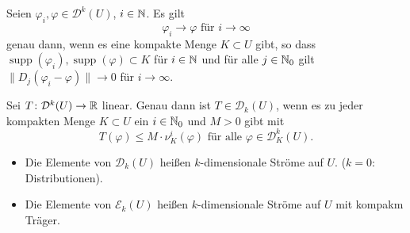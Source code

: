 \documentclass[a4paper,twoside,DIV15,BCOR12mm]{scrbook}
\DeclareMathOperator{\supp}{supp}
\begin{document}
\begin{lemma}
\label{lem:4.8}
Seien $\varphi_i, \varphi\in \mathcal D^k(U)$, $i\in \mathbb{N}$. Es gilt
\[
\varphi_i \to \varphi\text{ für }i\to\infty
\]
genau dann, wenn es eine kompakte Menge $K\subset U$ gibt, so dass $\supp(\varphi_i), \supp(\varphi) \subset K$ für $i\in \mathbb{N}$ und für alle $j\in\mathbb{N}_0$ gilt $\| D_j(\varphi_i - \varphi)\| \to 0$ für $i\to\infty$.
\end{lemma}

\begin{lemma}
\label{lem:4.9}
Sei $T\colon \mathcal D^k(U) \to\mathbb{R}$ linear. Genau dann ist $T\in \mathcal D_k(U)$, wenn es zu jeder kompakten Menge $K\subset U$ ein $i\in\mathbb{N}_0$ und $M>0$ gibt mit
\[
T(\varphi) \le M\cdot \nu_K^i(\varphi)  \text{ für alle } \varphi \in \mathcal D_K^k(U).
\]
\end{lemma}

\begin{definition}
\begin{itemize}
\item Die Elemente von $\mathcal D_k(U)$ heißen $k$-dimensionale Ströme auf $U$. ($k=0$: Distributionen).
\item Die Elemente von $\mathcal E_k(U)$ heißen $k$-dimensionale Ströme auf $U$ mit kompakm Träger.
\end{itemize}
\end{definition}
\end{document}
